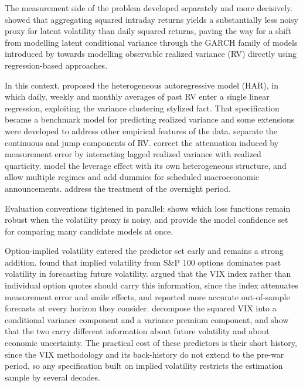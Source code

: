 \documentclass[preprint,12pt,authoryear]{elsarticle}
\begin{document}
The measurement side of the problem developed separately and more decisively. \citet{andersenbollerslev1998} showed that aggregating squared intraday returns yields a substantially less noisy proxy for latent volatility than daily squared returns, paving the way for a shift from modelling latent conditional variance through the GARCH family of models introduced by \citet{bollerslev1986} towards modelling observable realized variance (RV) directly using regression-based approaches.

In this context, \citet{corsi2009} proposed the heterogeneous autoregressive model (HAR), in which daily, weekly and monthly averages of past RV enter a single linear regression, exploiting the variance clustering stylized fact.
That specification became a benchmark model for predicting realized variance and some extensions were developed to address other empirical features of the data.
\citet{andersenbollerslevdiebold2007} separate the continuous and jump components of RV. \citet{bollerslevpattonquaedvlieg2016} correct the attenuation induced by measurement error by interacting lagged realized variance with realized quarticity. \citet{corsireno2012} model the leverage effect with its own heterogeneous structure, and \citet{mcaleermedeiros2008} allow multiple regimes and add dummies for scheduled macroeconomic announcements. \citet{hansenlunde2005} address the treatment of the overnight
period.

Evaluation conventions tightened in parallel: \citet{patton2011} shows which loss functions remain robust when the volatility proxy is noisy, and \citet{hansenlundenason2011} provide the model confidence set for comparing many candidate models at once.

Option-implied volatility entered the predictor set early and remains a strong addition. \citet{christensenprabhala1998} found that implied volatility from S\&P 100 options dominates past volatility in forecasting future volatility.
\citet{blairpoontaylor2001} argued that the VIX index rather than individual option quotes should carry this information, since the index attenuates measurement error and smile effects, and reported more accurate out-of-sample forecasts at every horizon they consider. \citet{bekaerthoerova2014} decompose the squared VIX into a conditional variance component and a variance premium component, and show that the two carry different information about future volatility and about economic uncertainty. The practical cost of these
predictors is their short history, since the VIX methodology and its back-history do not extend to the pre-war period, so any specification built on implied volatility restricts the estimation sample by several decades.
\end{document}
